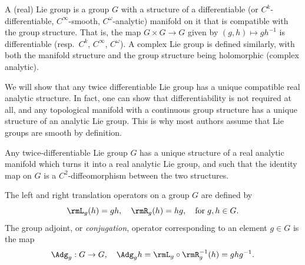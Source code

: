 \begin{defn}
    A (real) Lie group is a group $G$ with a structure of a differentiable (or $C^k$-differentiable, $C^\infty$-smooth, $C^\omega$-analytic) manifold on it that is compatible with the group structure. That is, the map $G\times G\to G$ given by $(g,h)\mapsto gh^{-1}$ is differentiable (resp.~$C^k$, $C^\infty$, $C^\omega$). A complex Lie group is defined similarly, with both the manifold structure and the group structure being holomorphic (complex analytic).
\end{defn}

We will show that any twice differentiable Lie group has a unique compatible real analytic structure. In fact, one can show that differentiability is not required at all, and any topological manifold with a continuous group structure has a unique structure of an analytic Lie group. This is why most authors assume that Lie groups are smooth by definition.

\begin{prop}[{{\cite[Thm.~1.6.3]{DK}}}]
    Any twice-differentiable Lie group $G$ has a unique structure of a real analytic manifold which turns it into a real analytic Lie group, and such that the identity map on $G$ is a $C^2$-diffeomorphism between the two structures.
\end{prop}


\begin{defn}
    The left and right translation operators on a group $G$ are defined by
    \[\rmL_g(h)=gh,\quad \rmR_g(h)=hg,\quad \text{for}\; g,h\in G.\]
    The group adjoint, or \emph{conjugation}, operator corresponding to an element $g\in G$ is the map
    \[\Adg_g:G\to G,\quad \Adg_g h=\rmL_g\circ \rmR_g^{-1}(h)=ghg^{-1}.\]
\end{defn}


